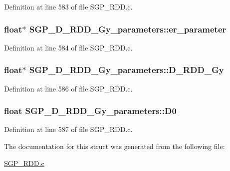 Definition at line 583 of file SGP\_\-RDD.c.\hypertarget{structSGP__D__RDD__Gy__parameters_5a01bc9322a4692308f137df0710b9b6}{
\subsubsection[er\_\-parameter]{\setlength{\rightskip}{0pt plus 5cm}float$\ast$ {\bf SGP\_\-D\_\-RDD\_\-Gy\_\-parameters::er\_\-parameter}}}
\label{d8/d35/structSGP__D__RDD__Gy__parameters_5a01bc9322a4692308f137df0710b9b6}




Definition at line 584 of file SGP\_\-RDD.c.\hypertarget{structSGP__D__RDD__Gy__parameters_07304a50cb2cd6847b2bc4eeaddb1682}{
\subsubsection[D\_\-RDD\_\-Gy]{\setlength{\rightskip}{0pt plus 5cm}float$\ast$ {\bf SGP\_\-D\_\-RDD\_\-Gy\_\-parameters::D\_\-RDD\_\-Gy}}}
\label{d8/d35/structSGP__D__RDD__Gy__parameters_07304a50cb2cd6847b2bc4eeaddb1682}




Definition at line 586 of file SGP\_\-RDD.c.\hypertarget{structSGP__D__RDD__Gy__parameters_2d283032cbcd5b341efcb4206bb2f19b}{
\subsubsection[D0]{\setlength{\rightskip}{0pt plus 5cm}float {\bf SGP\_\-D\_\-RDD\_\-Gy\_\-parameters::D0}}}
\label{d8/d35/structSGP__D__RDD__Gy__parameters_2d283032cbcd5b341efcb4206bb2f19b}




Definition at line 587 of file SGP\_\-RDD.c.

The documentation for this struct was generated from the following file:\begin{CompactItemize}
\item 
\hyperlink{SGP__RDD_8c}{SGP\_\-RDD.c}\end{CompactItemize}
